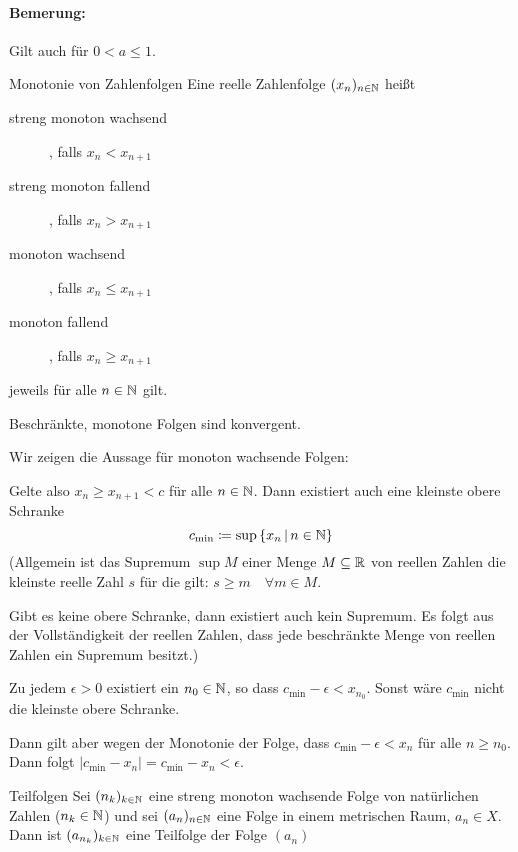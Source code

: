 \paragraph{Bemerung:} Gilt auch für $0<a\leq 1$.

\begin{definition}{Monotonie von Zahlenfolgen}
	Eine reelle Zahlenfolge $(x_n)_{n\in\mathbb{N}}$ heißt
	\begin{description}
		\item[streng monoton wachsend], falls $x_n<x_{n+1}$
		\item[streng monoton fallend], falls $x_n>x_{n+1}$
		\item[monoton wachsend], falls $x_n\leq x_{n+1}$
		\item[monoton fallend], falls $x_n\geq x_{n+1}$
	\end{description}
	jeweils für alle $n\in\mathbb{N}$ gilt.
\end{definition}

\begin{satz}{}
	Beschränkte, monotone Folgen sind konvergent.
\end{satz}
\beweis
Wir zeigen die Aussage für monoton wachsende Folgen:

Gelte also $x_n\geq x_{n+1}<c$ für alle $n\in\mathbb{N}$. Dann existiert auch eine kleinste obere Schranke
\begin{equation*}
	c_{\text{min}}\coloneqq \sup\left\{ x_n \,\middle|\, n\in\mathbb{N} \right\}
\end{equation*}
(Allgemein ist das Supremum $\sup M$ einer Menge $M\subseteq\mathbb{R}$ von reellen Zahlen die kleinste reelle Zahl $s$ für die gilt: $s\geq m\quad\forall m\in M$.

Gibt es keine obere Schranke, dann existiert auch kein Supremum. Es folgt aus der Vollständigkeit der reellen Zahlen, dass jede beschränkte Menge von reellen Zahlen ein Supremum besitzt.)

\par\medskip

Zu jedem $\epsilon>0$ existiert ein $n_0\in\mathbb{N}$, so dass $c_{\text{min}}-\epsilon<x_{n_0}$. Sonst wäre $c_{\text{min}}$ nicht die kleinste obere Schranke.

Dann gilt aber wegen der Monotonie der Folge, dass $c_{\text{min}}-\epsilon<x_n$ für alle $n\geq n_0$. Dann folgt $|c_{\text{min}}-x_n|=c_{\text{min}}-x_n<\epsilon$.


\begin{definition}{Teilfolgen}
	Sei $(n_k)_{k\in\mathbb{N}}$ eine streng monoton wachsende Folge von natürlichen Zahlen ($n_k\in\mathbb{N}$) und sei $(a_n)_{n\in\mathbb{N}}$ eine Folge in einem metrischen Raum, $a_n\in X$. Dann ist $(a_{n_k})_{k\in\mathbb{N}}$ eine Teilfolge der Folge $(a_n)$
\end{definition}
